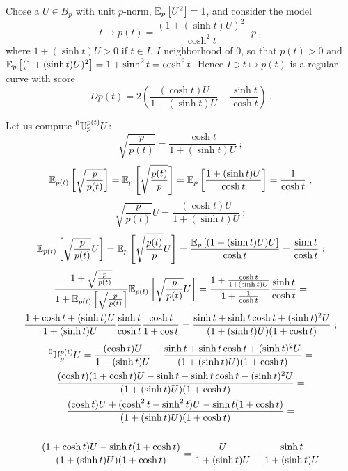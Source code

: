 \documentclass[12pt,a4paper]{amsart}
\begin{document}
\begin{exercise}
Chose a $U \in B_p$ with unit $p$-norm, ${\operatorname{\mathbb E}}_{p}\left[U^2\right] = 1$, and consider the model  
%
\begin{equation*}
   t \mapsto p(t) = \frac{(1+(\sinh t)U)^2}{\cosh^2 t} \cdot p \ ,
 \end{equation*}
%
where $1+(\sinh t)U > 0$ if $t \in I$, $I$ neighborhood of 0, so that $p(t) > 0$ and ${\operatorname{\mathbb E}}_{p}\left[(1+(\sinh t)U)^2\right] = 1 + \sinh^2 t = \cosh^2 t$. Hence $I \ni t \mapsto p(t)$ is a regular curve with score
%
\begin{equation*}
  Dp(t) = 2 \left(\frac{(\cosh t)U}{1+(\sinh t)U} - \frac{\sinh t}{\cosh t}\right) \ .
\end{equation*}

Let us compute $\prescript{0}{}{\mathbb U}_{p}^{p(t)} U$:
%
\begin{equation*}
  \sqrt{\frac{p}{p(t)}} = \frac{\cosh t}{1+(\sinh t)U} \ ;
\end{equation*}
%
\begin{equation*}
  {\operatorname{\mathbb E}}_{p(t)}\left[\sqrt{\frac{p}{p(t)}}\right] = {\operatorname{\mathbb E}}_{p}\left[\sqrt{\frac{p(t)}{p}}\right] = {\operatorname{\mathbb E}}_{p}\left[\frac{1+(\sinh t)U}{\cosh t}\right] = \frac{1}{\cosh t} \ ;
\end{equation*}
%
\begin{equation*}
  \sqrt{\frac{p}{p(t)}} U =  \frac{(\cosh t)U}{1+(\sinh t)U} \ ;
\end{equation*}
%
\begin{equation*}
  {\operatorname{\mathbb E}}_{p(t)}\left[\sqrt{\frac{p}{p(t)}}U\right] = {\operatorname{\mathbb E}}_{p}\left[\sqrt{\frac{p(t)}{p}}U\right] = \frac{{\operatorname{\mathbb E}}_{p}\left[(1+(\sinh t)U)U\right]}{\cosh t} = \frac{\sinh t}{\cosh t} \ ;
\end{equation*}
%
\begin{multline*}
\frac{1+\sqrt{\frac{p}{p(t)}}}{1+{\operatorname{\mathbb E}}_{p(t)}\left[\sqrt{\frac{p}{p(t)}}\right]} {\operatorname{\mathbb E}}_{p(t)}\left[\sqrt{\frac{p}{p(t)}}U\right] = \frac{1+\frac{\cosh t}{1+(\sinh t)U}}{1+\frac{1}{\cosh t}} \frac{\sinh t}{\cosh t} = \\
\frac{1+\cosh t+(\sinh t)U}{1+(\sinh t)U} \frac{\sinh t}{\cosh t}\frac{\cosh t}{1 + \cos t} = \frac{\sinh t + \sinh t \cosh t + (\sinh t)^2U}{(1+(\sinh t)U)(1 + \cosh t)} \ ;
\end{multline*}
%
\begin{multline*}
  \prescript{0}{}{\mathbb U}_{p}^{p(t)} U = \frac{(\cosh t)U}{1+(\sinh t)U} - \frac{\sinh t + \sinh t \cosh t + (\sinh t)^2U}{(1+(\sinh t)U)(1 + \cosh t)} = \\ \frac{(\cosh t)(1 + \cosh t)U - \sinh t - \sinh t \cosh t - (\sinh t)^2U}{(1+(\sinh t)U)(1 + \cosh t)} = \\ \frac{(\cosh t) U + (\cosh^2 t - \sinh^2 t)U - \sinh t(1+ \cosh t)}{(1+(\sinh t)U)(1 + \cosh t)} = \\ \\ \frac{(1 + \cosh t) U - \sinh t(1+ \cosh t)}{(1+(\sinh t)U)(1 + \cosh t)} = \frac{U}{1 + (\sinh t)U} - \frac{\sinh t}{1+(\sinh t)U} \\ 
\end{multline*}
\end{exercise}
\end{document}
